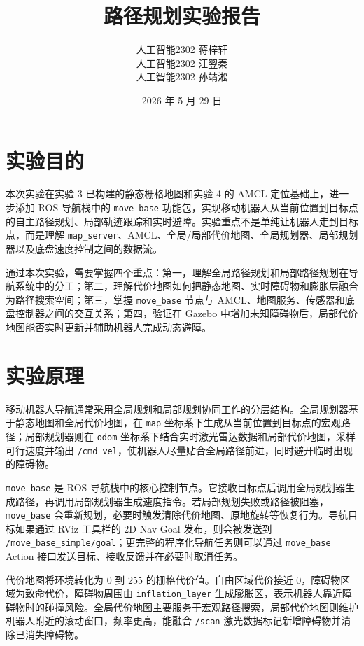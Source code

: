 \documentclass[11pt,a4paper,fontset=fandol]{ctexart}
\title{\bfseries 路径规划实验报告}
\author{人工智能2302 \quad 蒋梓轩\\
人工智能2302 \quad 汪翌秦\\
人工智能2302 \quad 孙靖淞}
\date{2026 年 5 月 29 日}
\begin{document}
\maketitle

\section{实验目的}

本次实验在实验 3 已构建的静态栅格地图和实验 4 的 AMCL 定位基础上，进一步添加 ROS 导航栈中的 \verb|move_base| 功能包，实现移动机器人从当前位置到目标点的自主路径规划、局部轨迹跟踪和实时避障。实验重点不是单纯让机器人走到目标点，而是理解 \verb|map_server|、AMCL、全局/局部代价地图、全局规划器、局部规划器以及底盘速度控制之间的数据流。

通过本次实验，需要掌握四个重点：第一，理解全局路径规划和局部路径规划在导航系统中的分工；第二，理解代价地图如何把静态地图、实时障碍物和膨胀层融合为路径搜索空间；第三，掌握 \verb|move_base| 节点与 AMCL、地图服务、传感器和底盘控制器之间的交互关系；第四，验证在 Gazebo 中增加未知障碍物后，局部代价地图能否实时更新并辅助机器人完成动态避障。

\section{实验原理}

移动机器人导航通常采用全局规划和局部规划协同工作的分层结构。全局规划器基于静态地图和全局代价地图，在 \verb|map| 坐标系下生成从当前位置到目标点的宏观路径；局部规划器则在 \verb|odom| 坐标系下结合实时激光雷达数据和局部代价地图，采样可行速度并输出 \verb|/cmd_vel|，使机器人尽量贴合全局路径前进，同时避开临时出现的障碍物。

\verb|move_base| 是 ROS 导航栈中的核心控制节点。它接收目标点后调用全局规划器生成路径，再调用局部规划器生成速度指令。若局部规划失败或路径被阻塞，\verb|move_base| 会重新规划，必要时触发清除代价地图、原地旋转等恢复行为。导航目标如果通过 RViz 工具栏的 2D Nav Goal 发布，则会被发送到 \verb|/move_base_simple/goal|；更完整的程序化导航任务则可以通过 \verb|move_base| Action 接口发送目标、接收反馈并在必要时取消任务。

代价地图将环境转化为 0 到 255 的栅格代价值。自由区域代价接近 0，障碍物区域为致命代价，障碍物周围由 \verb|inflation_layer| 生成膨胀区，表示机器人靠近障碍物时的碰撞风险。全局代价地图主要服务于宏观路径搜索，局部代价地图则维护机器人附近的滚动窗口，频率更高，能融合 \verb|/scan| 激光数据标记新增障碍物并清除已消失障碍物。
\end{document}
